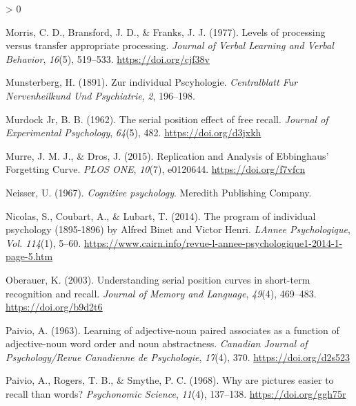 \documentclass[
  oneside,
  12pt]{crumpbook}
\newlength{\cslhangindent}
\newenvironment{CSLReferences}[2] %
 {%
  \setlength{\parindent}{0pt}
  \ifodd #1 \everypar{\setlength{\hangindent}{\cslhangindent}}\ignorespaces\fi
  \ifnum #2 > 0
  \setlength{\parskip}{#2\baselineskip}
  \fi
 }%
 {}
\begin{document}
\begin{CSLReferences}{1}{0}
\leavevmode\hypertarget{ref-morrisLevelsProcessingTransfer1977}{}%
Morris, C. D., Bransford, J. D., \& Franks, J. J. (1977). Levels of processing versus transfer appropriate processing. \emph{Journal of Verbal Learning and Verbal Behavior}, \emph{16}(5), 519--533. \url{https://doi.org/cjf38v}

\leavevmode\hypertarget{ref-munsterbergZurIndividualPscyhologie1891}{}%
Munsterberg, H. (1891). Zur individual {Pscyhologie}. \emph{Centralblatt Fur Nervenheilkund Und Psychiatrie}, \emph{2}, 196--198.

\leavevmode\hypertarget{ref-murdockjrSerialPositionEffect1962}{}%
Murdock Jr, B. B. (1962). The serial position effect of free recall. \emph{Journal of Experimental Psychology}, \emph{64}(5), 482. \url{https://doi.org/d3jxkh}

\leavevmode\hypertarget{ref-murreReplicationAnalysisEbbinghaus2015}{}%
Murre, J. M. J., \& Dros, J. (2015). Replication and {Analysis} of {Ebbinghaus}' {Forgetting Curve}. \emph{PLOS ONE}, \emph{10}(7), e0120644. \url{https://doi.org/f7vfcn}

\leavevmode\hypertarget{ref-neisserCognitivePsychology1967}{}%
Neisser, U. (1967). \emph{Cognitive psychology}. {Meredith Publishing Company}.

\leavevmode\hypertarget{ref-nicolasProgramIndividualPsychology2014}{}%
Nicolas, S., Coubart, A., \& Lubart, T. (2014). The program of individual psychology (1895-1896) by {Alfred Binet} and {Victor Henri}. \emph{LAnnee Psychologique}, \emph{Vol. 114}(1), 5--60. \url{https://www.cairn.info/revue-l-annee-psychologique1-2014-1-page-5.htm}

\leavevmode\hypertarget{ref-oberauerUnderstandingSerialPosition2003}{}%
Oberauer, K. (2003). Understanding serial position curves in short-term recognition and recall. \emph{Journal of Memory and Language}, \emph{49}(4), 469--483. \url{https://doi.org/b9d2t6}

\leavevmode\hypertarget{ref-paivioLearningAdjectivenounPaired1963}{}%
Paivio, A. (1963). Learning of adjective-noun paired associates as a function of adjective-noun word order and noun abstractness. \emph{Canadian Journal of Psychology/Revue Canadienne de Psychologie}, \emph{17}(4), 370. \url{https://doi.org/d2s523}

\leavevmode\hypertarget{ref-paivioWhyArePictures1968}{}%
Paivio, A., Rogers, T. B., \& Smythe, P. C. (1968). Why are pictures easier to recall than words? \emph{Psychonomic Science}, \emph{11}(4), 137--138. \url{https://doi.org/ggh75r}


\end{CSLReferences}
\end{document}
